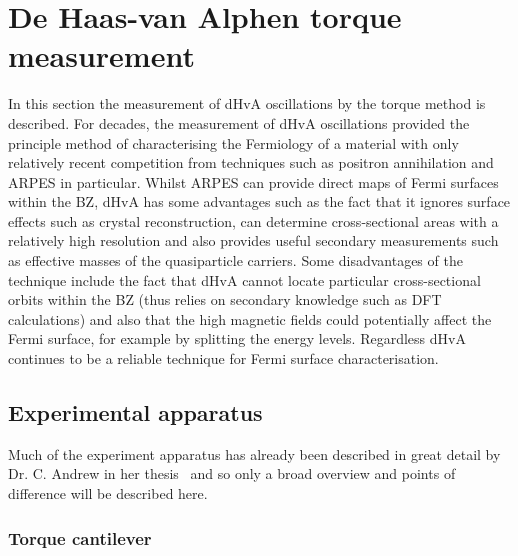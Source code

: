 
\section{De Haas-van Alphen torque measurement}

In this section the measurement of \ac{dHvA} oscillations by the torque method is described. For decades, the measurement of \ac{dHvA} oscillations provided the principle method of characterising the Fermiology of a material with only relatively recent competition from techniques such as positron annihilation and \ac{ARPES} in particular. Whilst \ac{ARPES} can provide direct maps of Fermi surfaces within the \ac{BZ}, \ac{dHvA} has some advantages such as the fact that it ignores surface effects such as crystal reconstruction, can determine cross-sectional areas with a relatively high resolution and also provides useful secondary measurements such as effective masses of the quasiparticle carriers.  Some disadvantages of the technique include the fact that \ac{dHvA} cannot locate particular cross-sectional orbits within the \ac{BZ} (thus relies on secondary knowledge such as \ac{DFT} calculations) and also that the high magnetic fields could potentially affect the Fermi surface, for example by splitting the energy levels. Regardless \ac{dHvA} continues to be a reliable technique for Fermi surface characterisation.

\subsection{Experimental apparatus}

Much of the experiment apparatus has already been described in great detail by Dr. C. Andrew in her thesis~\cite{Andrew2010} and so only a broad overview and points of difference will be described here. 

\subsubsection{Torque cantilever}

